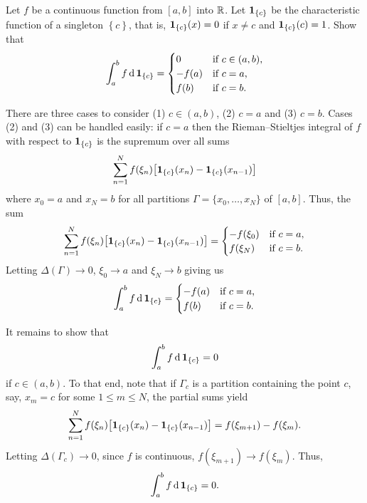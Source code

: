 \begin{problem}
  Let \(f\) be a continuous function from \([a,b]\) into \(\mathbb{R}\). Let
  \(\operatorname{\mathbf{1}}_{\{c\}}\) be the characteristic function of a singleton
  \(\left\{c\right\}\), that is, \(\operatorname{\mathbf{1}}_{\{c\}}(x)=0\) if \(x\neq c\) and
  \(\operatorname{\mathbf{1}}_{\{c\}}(c)=1\). Show that
  \[
    \int_a^b f \mathop{}\!\mathrm{d}\operatorname{\mathbf{1}}_{\{c\}}=
    \begin{cases}
      0&\text{if \(c\in(a,b)\),}\\
      -f(a)&\text{if \(c=a\),}\\
      f(b)&\text{if \(c=b\).}
    \end{cases}
  \]
\end{problem}
\begin{solution}
  There are three cases to consider (1) \(c\in(a,b)\), (2) \(c=a\) and (3)
  \(c=b\). Cases (2) and (3) can be handled easily: if \(c=a\) then the
  Rieman--Stieltjes integral of \(f\) with respect to \(\operatorname{\mathbf{1}}_{\{c\}}\) is
  the supremum over all sums
  \[
    \sum_{n=1}^N f(\xi_n)\bigl[ \operatorname{\mathbf{1}}_{\{c\}}(x_n)-\operatorname{\mathbf{1}}_{\{c\}}(x_{n-1})\bigr]
  \]
  where \(x_0=a\) and \(x_N=b\) for all partitions
  \(\Gamma=\{x_0,\dotsc,x_N\}\) of \([a,b]\). Thus, the sum
  \[
    \sum_{n=1}^N
    f(\xi_n)\bigl[\operatorname{\mathbf{1}}_{\{c\}}(x_n)-\operatorname{\mathbf{1}}_{\{c\}}(x_{n-1})\bigr]
    =\begin{cases}
      -f(\xi_0)&\text{if \(c=a\),}\\
      f(\xi_N)&\text{if \(c=b\).}
    \end{cases}
  \]
  Letting \(\Delta(\Gamma)\to 0\), \(\xi_0\to a\) and \(\xi_N\to b\) giving
  us
  \[
    \int_a^b f \mathop{}\!\mathrm{d}\operatorname{\mathbf{1}}_{\{c\}}=
    \begin{cases}
      -f(a)&\text{if \(c=a\),}\\
      f(b)&\text{if \(c=b\).}
    \end{cases}
  \]

  It remains to show that
  \[
    \int_a^b f\mathop{}\!\mathrm{d}\operatorname{\mathbf{1}}_{\{c\}}=0
  \]
  if \(c\in(a,b)\). To that end, note that if \(\Gamma_c\) is a partition
  containing the point \(c\), say, \(x_m=c\) for some \(1\leq m\leq N\),
  the partial sums yield
  \[
    \sum_{n=1}^N
    f(\xi_n)\bigl[\operatorname{\mathbf{1}}_{\{c\}}(x_n)-\operatorname{\mathbf{1}}_{\{c\}}(x_{n-1})\bigr]
    =f(\xi_{m+1})-f(\xi_m).
  \]
  Letting \(\Delta(\Gamma_c)\to 0\), since \(f\) is continuous,
  \(f(\xi_{m+1})\to f(\xi_m)\). Thus,
  \[
    \int_a^b f\mathop{}\!\mathrm{d}\operatorname{\mathbf{1}}_{\{c\}}=0.
  \]
\end{solution}


